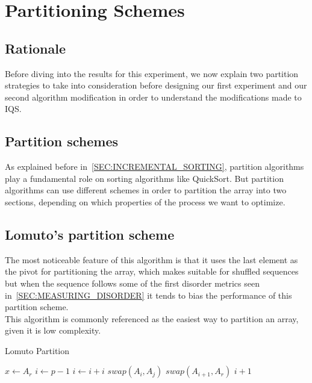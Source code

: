 \section{Partitioning Schemes}
\label{SECTION:PARTITIONING_SCHEMES}

\subsection{Rationale}
Before diving into the results for this experiment, we now explain two partition strategies to take into consideration before designing our first experiment and our second algorithm modification in order to understand the modifications made to IQS.\\

\subsection{Partition schemes}
As explained before in~\ref{SEC:INCREMENTAL_SORTING}, partition algorithms play a fundamental role on sorting algorithms like QuickSort. But partition algorithms can use different schemes in order to partition the array into two sections, depending on which properties of the process we want to optimize.\\

\subsection{Lomuto's partition scheme}

The most noticeable feature of this algorithm is that it uses the last element as the pivot for partitioning the array, which makes suitable for shuffled sequences but when the sequence follows some of the first disorder metrics seen in~\ref{SEC:MEASURING_DISORDER} it tends to bias the performance of this partition scheme.\\

This algorithm is commonly referenced as the easiest way to partition an array, given it is low complexity.\\

\begin{algorithm}
\caption{Lomuto Partition}\label{ALG:LOMUTO_PARTITION}
\begin{algorithmic}[1]
    \State $x \gets A_r$
    \State $i \gets p-1$
        \State $i \gets i + i$
        \State $swap(A_i, A_j)$
    \EndIf
    \EndFor
    \State $swap(A_{i+1}, A_r)$
    \State \Return $i + 1$
    \EndProcedure
\end{algorithmic}
\end{algorithm}


